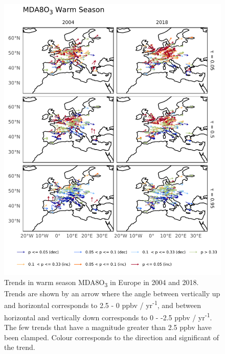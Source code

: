 \documentclass[journal abbreviation, manuscript]{copernicus}
\begin{document}
\begin{figure}[p]
\centering
\includegraphics[height=0.9\textheight]{figures/paper_figures/f05_o3_map_mda8_warm_eu_o3.pdf}
\caption{Trends in warm season MDA8O\textsubscript{3} in Europe in 2004 and 2018. Trends are shown by an arrow where the angle between vertically up and horizontal corresponds to 2.5 - 0 ppbv / yr\textsuperscript{-1}, and between horizontal and vertically down corresponds to 0 - -2.5 ppbv / yr\textsuperscript{-1}. The few trends that have a magnitude greater than 2.5 ppbv have been clamped. Colour corresponds to the direction and significant of the trend.}
\label{fig:o3_map_eu_mda8_warm}
\end{figure}
\clearpage
\end{document}
